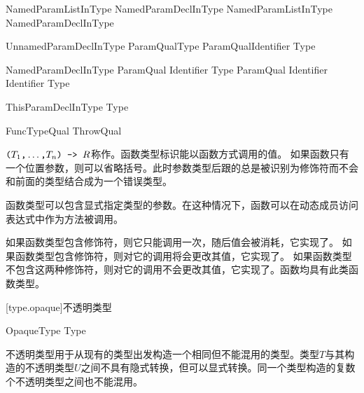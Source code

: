 \begin{bnf}{NamedParamListInType}
    NamedParamDeclInType \br
    NamedParamListInType \terminal{,} NamedParamDeclInType
\end{bnf}

\begin{bnf}{UnnamedParamDeclInType}
    ParamQual\bnfq Type \br
    ParamQual\bnfq Identifier \terminal{:} Type\bnfq
\end{bnf}

\begin{bnf}{NamedParamDeclInType}
    ParamQual\bnfq \terminal{(} Identifier \terminal{)} Type\bnfq
    ParamQual\bnfq \terminal{(} Identifier \terminal{)} Identifier \terminal{:} Type\bnfq
\end{bnf}

\begin{bnf}{ThisParamDeclInType}
     \terminal{:} Type
\end{bnf}

\begin{bnf}{FuncTypeQual}
    ThrowQual \br
     \br
     \br
     \br
\end{bnf}

\pnum
$\texttt{(}T_1\texttt{,} \ldots\texttt{,} T_n\texttt{) -> }R$称作。函数类型标识能以函数方式调用的值。
如果函数只有一个位置参数，则可以省略括号。此时参数类型后跟的总是被识别为修饰符而不会和前面的类型结合成为一个错误类型。

\pnum
函数类型可以包含显式指定类型的参数。在这种情况下，函数可以在动态成员访问表达式中作为方法被调用。

\pnum
如果函数类型包含修饰符，则它只能调用一次，随后值会被消耗，它实现了。
如果函数类型包含修饰符，则对它的调用将会更改其值，它实现了。
如果函数类型不包含这两种修饰符，则对它的调用不会更改其值，它实现了。函数均具有此类函数类型。

[type.opaque]{不透明类型}

\begin{bnf}{OpaqueType}
     Type
\end{bnf}

\pnum
不透明类型用于从现有的类型出发构造一个相同但不能混用的类型。类型$T$与其构造的不透明类型$U$之间不具有隐式转换，但可以显式转换。同一个类型构造的复数个不透明类型之间也不能混用。

